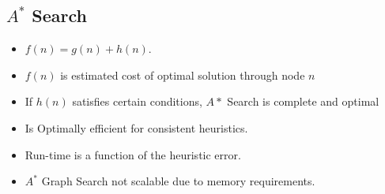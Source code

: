 \subsection{$A^*$ Search}
\begin{itemize}
    \item $f(n) = g(n) + h(n)$.
    \item $f(n)$ is estimated cost of optimal solution through node $n$
    \item If $h(n)$ satisfies certain conditions, $A*$ Search is complete and optimal
    \item Is Optimally efficient for consistent heuristics.
    \item Run-time is a function of the heuristic error.
    \item $A^*$ Graph Search not scalable due to memory requirements.
\end{itemize}
